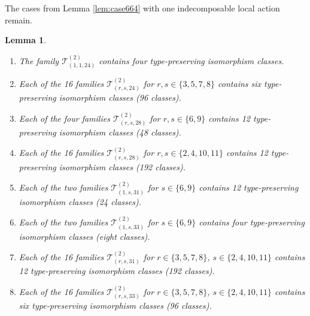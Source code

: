 \documentclass[dvipsnames]{article}
\newtheorem{lemma}[theorem]{Lemma}
\theoremstyle{definition}
\theoremstyle{remark}
\begin{document}
    The cases from Lemma \ref{lem:case664} with one indecomposable local action remain.
    
    \begin{lemma}\label{lem:non_dec}
        \begin{enumerate}
            \item The family $\mathcal T_{(1,1,24)}^{(2)}$ contains four type-preserving isomorphism classes.
            \item Each of the 16 families $\mathcal T_{(r,s,24)}^{(2)}$ for $r,s \in \{3,5,7,8\}$ contains six type-preserving isomorphism classes (96 classes).
            \item Each of the four families $\mathcal T_{(r,s,28)}^{(2)}$ for $r, s \in \{6,9\}$ contains 12 type-preserving isomorphism classes (48 classes).
            \item Each of the 16 families $\mathcal T_{(r,s,28)}^{(2)}$ for $r, s \in \{2,4,10,11\}$ contains 12 type-preserving isomorphism classes (192 classes).
            \item Each of the two families $\mathcal T_{(1,s,31)}^{(2)}$ for $s \in \{6,9\}$ contains 12 type-preserving isomorphism classes (24 classes).
            \item Each of the two families $\mathcal T_{(1,s,33)}^{(2)}$ for $s \in \{6,9\}$ contains four type-preserving isomorphism classes (eight classes).
            \item Each of the 16 families $\mathcal T_{(r,s,31)}^{(2)}$ for $r\in\{3,5,7,8\}$, $s \in \{2,4,10,11\}$ contains 12 type-preserving isomorphism classes (192 classes).
            \item Each of the 16 families $\mathcal T_{(r,s,33)}^{(2)}$ for $r\in\{3,5,7,8\}$, $s \in \{2,4,10,11\}$ contains six type-preserving isomorphism classes (96 classes).
        \end{enumerate}
    \end{lemma}
\end{document}
